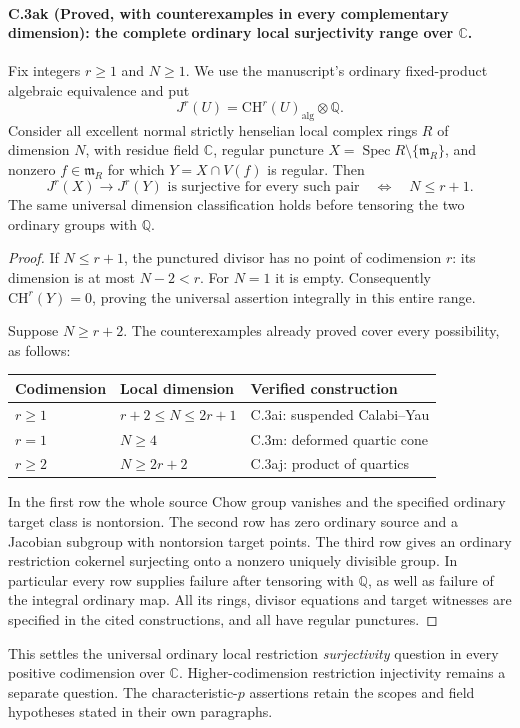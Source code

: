 \paragraph{C.3ak (Proved, with counterexamples in every complementary dimension): the complete ordinary local surjectivity range over $\mathbb C$.}
Fix integers $r\ge1$ and $N\ge1$. We use the manuscript's
ordinary fixed-product algebraic equivalence and put
\[
        J^r(U)=\mathrm{CH}^r(U)_{\mathrm{alg}}\otimes\mathbb Q.
\]
Consider all excellent normal strictly henselian local
complex rings $R$ of dimension $N$, with residue field
$\mathbb C$, regular puncture
$X=\operatorname{Spec}R\setminus\{\mathfrak m_R\}$, and
nonzero $f\in\mathfrak m_R$ for which
$Y=X\cap V(f)$ is regular. Then
\[
 \boxed{\quad
 J^r(X)\longrightarrow J^r(Y)
 \text{ is surjective for every such pair}
       \quad\Longleftrightarrow\quad N\le r+1.
 \quad}
\]
The same universal dimension classification holds before
tensoring the two ordinary groups with $\mathbb Q$.

\begin{proof}
If $N\le r+1$, the punctured divisor has no point of
codimension $r$: its dimension is at most $N-2<r$.
For $N=1$ it is empty. Consequently
$\mathrm{CH}^r(Y)=0$, proving the universal assertion
integrally in this entire range.

Suppose $N\ge r+2$. The counterexamples already proved
cover every possibility, as follows:
\begin{center}
\begin{tabular}{lll}
\toprule
Codimension & Local dimension & Verified construction \\
\midrule
$r\ge1$ & $r+2\le N\le2r+1$ & C.3ai: suspended Calabi--Yau \\
$r=1$ & $N\ge4$ & C.3m: deformed quartic cone \\
$r\ge2$ & $N\ge2r+2$ & C.3aj: product of quartics \\
\bottomrule
\end{tabular}
\end{center}
In the first row the whole source Chow group vanishes and
the specified ordinary target class is nontorsion. The
second row has zero ordinary source and a Jacobian subgroup
with nontorsion target points. The third row gives an
ordinary restriction cokernel surjecting onto a nonzero
uniquely divisible group. In particular every row supplies
failure after tensoring with $\mathbb Q$, as well as failure
of the integral ordinary map. All its rings, divisor
equations and target witnesses are specified in the cited
constructions, and all have regular punctures.
\end{proof}

This settles the universal ordinary local restriction
\emph{surjectivity} question in every positive codimension
over $\mathbb C$. Higher-codimension restriction
injectivity remains a separate question. The
characteristic-$p$ assertions retain the scopes and field
hypotheses stated in their own paragraphs.
